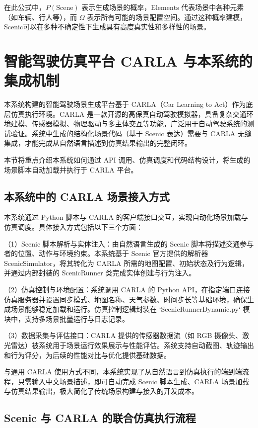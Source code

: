 在此公式中，$P(\text{Scene})$ 表示生成场景的概率，$\text{Elements}$ 代表场景中各种元素（如车辆、行人等），而 $\Omega$ 表示所有可能的场景配置空间。通过这种概率建模，Scenic可以在多种不确定性下生成具有高度真实性和多样性的场景。


\section{智能驾驶仿真平台 CARLA 与本系统的集成机制}

本系统构建的智能驾驶场景生成平台基于 CARLA（Car Learning to Act）作为底层仿真执行环境。CARLA 是一款开源的高保真自动驾驶模拟器，具备复杂交通环境建模、传感器模拟、物理驱动与多主体交互等功能，广泛用于自动驾驶系统的测试验证。系统中生成的结构化场景代码（基于 Scenic 表达）需要与 CARLA 无缝集成，才能完成从自然语言描述到仿真结果输出的完整闭环。

本节将重点介绍本系统如何通过 API 调用、仿真调度和代码结构设计，将生成的场景脚本自动加载并执行于 CARLA 平台。

\subsection{本系统中的 CARLA 场景接入方式}

本系统通过 Python 脚本与 CARLA 的客户端接口交互，实现自动化场景加载与仿真调度。具体接入方式包括以下三个方面：


（1）Scenic 脚本解析与实体注入：由自然语言生成的 Scenic 脚本将描述交通参与者的位置、动作与环境约束。本系统基于 Scenic 官方提供的解析器 ScenicSimulator，将其转化为 CARLA 所需的地图配置、初始状态及行为逻辑，并通过内部封装的 ScenicRunner 类完成实体创建与行为注入。

（2）仿真控制与环境配置：系统调用 CARLA 的 Python API，在指定端口连接仿真服务器并设置同步模式、地图名称、天气参数、时间步长等基础环境，确保生成场景能够稳定加载和运行。仿真控制逻辑封装在 `ScenicRunnerDynamic.py` 模块中，支持多场景批量运行与日志记录。

（3）数据采集与评估接口：CARLA 提供的传感器数据流（如 RGB 摄像头、激光雷达）被系统用于场景运行效果展示与性能评估。系统支持自动截图、轨迹输出和行为评分，为后续的性能对比与优化提供基础数据。

与通用 CARLA 使用方式不同，本系统实现了从自然语言到仿真执行的端到端流程，只需输入中文场景描述，即可自动完成 Scenic 脚本生成、CARLA 场景加载与仿真结果输出，极大简化了传统场景构建与接入的开发成本。


\subsection{Scenic 与 CARLA 的联合仿真执行流程}

